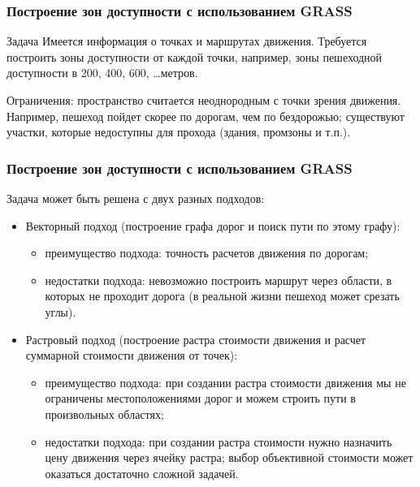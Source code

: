 
\begin{frame}
    \frametitle{Построение зон доступности с использованием GRASS}
    \begin{block}{Задача}
        Имеется информация о точках и маршрутах движения. Требуется построить зоны доступности от каждой точки, например,
        зоны пешеходной доступности в 200, 400, 600, \dots метров.

        Ограничения: пространство считается неоднородным с точки зрения движения. Например, пешеход пойдет скорее по дорогам, чем
        по бездорожью; существуют участки, которые недоступны для прохода (здания, промзоны и т.п.).
    \end{block}

\end{frame}

\begin{frame}
    \frametitle{Построение зон доступности с использованием GRASS}
    Задача может быть решена с двух разных подходов:
    \begin{itemize}
        \item Векторный подход (построение графа дорог и поиск пути по этому графу):
        \begin{itemize}
            \item преимущество подхода: точность расчетов движения по дорогам;
            \item недостатки подхода: невозможно построить маршрут через области, в которых не проходит дорога (в реальной жизни пешеход может срезать углы).
        \end{itemize}
        \item Растровый подход (построение растра стоимости движения и расчет суммарной стоимости движения от точек):
        \begin{itemize}
            \item преимущество подхода: при создании растра стоимости движения мы не ограничены местоположениями дорог и можем строить пути в произвольных областях;
            \item недостатки подхода: при создании растра стоимости нужно назначить цену движения через ячейку растра; выбор объективной стоимости может оказаться достаточно сложной задачей.
        \end{itemize}
    \end{itemize}

\end{frame}

